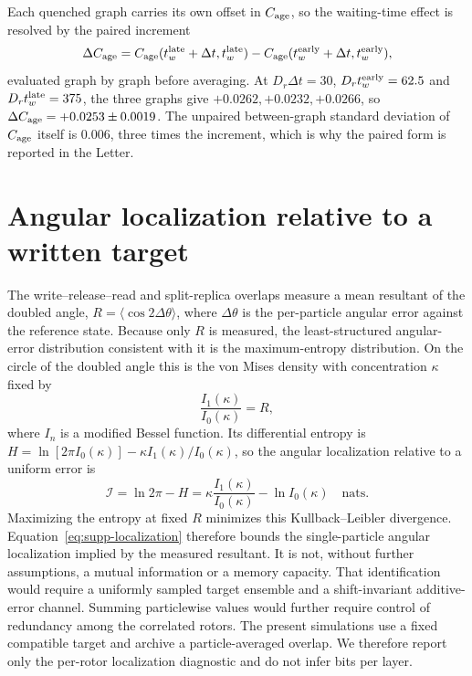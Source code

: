 \documentclass[aps,prl,onecolumn,superscriptaddress,nofootinbib]{revtex4-2}
\begin{document}
Each quenched graph carries its own offset in \(C_{\rm age}\), so the
waiting-time effect is resolved by the paired increment
\begin{equation}
 \Delta C_{\rm age}=
 C_{\rm age}(t_w^{\rm late}+\Delta t,t_w^{\rm late})-
 C_{\rm age}(t_w^{\rm early}+\Delta t,t_w^{\rm early}),
 \label{eq:supp-paired-aging}
\end{equation}
evaluated graph by graph before averaging.  At \(D_r\Delta t=30\),
\(D_rt_w^{\rm early}=62.5\) and \(D_rt_w^{\rm late}=375\), the three graphs
give \(+0.0262,+0.0232,+0.0266\), so
\(\Delta C_{\rm age}=+0.0253\pm0.0019\).  The unpaired between-graph standard
deviation of \(C_{\rm age}\) itself is 0.006, three times the increment, which
is why the paired form is reported in the Letter.

\section{Angular localization relative to a written target}

The write--release--read and split-replica overlaps measure a mean resultant
of the doubled angle, \(R=\langle\cos2\Delta\theta\rangle\), where
\(\Delta\theta\) is the per-particle angular error against the reference
state. Because only \(R\) is measured, the least-structured angular-error
distribution consistent with it is the maximum-entropy distribution. On the circle of the
doubled angle this is the von Mises density with concentration \(\kappa\)
fixed by
\begin{equation}
 \frac{I_1(\kappa)}{I_0(\kappa)}=R,
 \label{eq:supp-vonmises}
\end{equation}
where \(I_n\) is a modified Bessel function. Its differential entropy is
\(H=\ln[2\pi I_0(\kappa)]-\kappa I_1(\kappa)/I_0(\kappa)\), so the angular
localization relative to a uniform error is
\begin{equation}
 \mathcal I=\ln 2\pi-H=
 \kappa\frac{I_1(\kappa)}{I_0(\kappa)}-\ln I_0(\kappa)
 \quad\text{nats.}
 \label{eq:supp-localization}
\end{equation}
Maximizing the entropy at fixed \(R\) minimizes this Kullback--Leibler
divergence. Equation~\eqref{eq:supp-localization} therefore bounds the
single-particle angular localization implied by the measured resultant. It is
not, without further assumptions, a mutual information or a memory capacity.
That identification would require a uniformly sampled target ensemble and a
shift-invariant additive-error channel. Summing particlewise values would
further require control of redundancy among the correlated rotors. The
present simulations use a fixed compatible target and archive a
particle-averaged overlap. We therefore report only the per-rotor localization
diagnostic and do not infer bits per layer.
\end{document}
